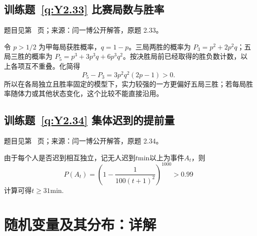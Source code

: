 \documentclass[UTF8,12pt,a4paper,fontset=fandol]{ctexbook}
\begin{document}
\subsection*{训练题~\ref{q:Y2.33} 比赛局数与胜率}\label{a:Y2.33}{\small 题目见第~\pageref{q:Y2.33} 页；来源：闫一博公开解答，原题 2.33。}
\begin{solve}令 $p>1/2$ 为甲每局获胜概率，$q=1-p$。三局两胜的概率为 $P_3=p^2+2p^2q$；五局三胜的概率为 $P_5=p^3+3p^3q+6p^3q^2$。按决胜局前已经取得的胜负数计数，以上各项互不重叠。化简得\[P_5-P_3=3p^2q^2(2p-1)>0.\]所以在各局独立且胜率固定的模型下，实力较强的一方更偏好五局三胜；若每局胜率随体力或其他状态变化，这个比较不能直接沿用。\end{solve}

\subsection*{训练题~\ref{q:Y2.34} 集体迟到的提前量}\label{a:Y2.34}{\small 题目见第~\pageref{q:Y2.34} 页；来源：闫一博公开解答，原题 2.34。}
\begin{solve}
由于每个人是否迟到相互独立，记无人迟到$t$min以上为事件$A_t$，则
\[P({A_t}) = {(1 - \frac{1}{{100{{(t + 1)}^2}}})^{1000}} > 0.99\]
计算可得$t\geqslant 31$min.
\end{solve}

\clearpage\section*{随机变量及其分布：详解}
\end{document}
